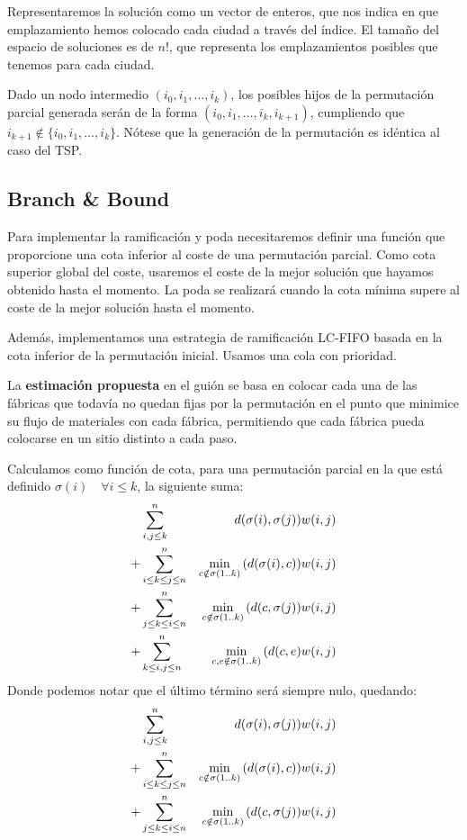 \documentclass[a4paper, 11pt]{article} %
\begin{document}
      Representaremos la solución como un vector de enteros, que nos indica en que emplazamiento hemos colocado cada ciudad a 
      través del índice. El tamaño del espacio de soluciones es de $n!$, que representa los emplazamientos posibles que tenemos 
      para cada ciudad.
      
      Dado un nodo intermedio $(i_0,i_1,\dots,i_k)$, los posibles hijos de la permutación parcial generada serán
      de la forma $(i_0,i_1,\dots,i_k, i_{k+1})$, cumpliendo que $i_{k+1} \notin \{i_0,i_1,\dots,i_k\}$. Nótese
      que la generación de la permutación es idéntica al caso del TSP.
    
    \subsection{Branch \& Bound}
      Para implementar la ramificación y poda necesitaremos definir una función que proporcione una
      cota inferior al coste de una permutación parcial. Como cota superior global del coste, usaremos el
      coste de la mejor solución que hayamos obtenido hasta el momento. La poda se realizará cuando la cota
      mínima supere al coste de la mejor solución hasta el momento.
      
      Además, implementamos una estrategia de ramificación LC-FIFO basada en la cota inferior de la permutación
      inicial. Usamos una cola con prioridad.
      
      La \textbf{estimación propuesta} en el guión se basa en colocar cada una de las fábricas que todavía no
      quedan fijas por la permutación en el punto que minimice su flujo de materiales con cada fábrica,
      permitiendo que cada fábrica pueda colocarse en un sitio distinto a cada paso.
      
      Calculamos como función de cota, para una permutación parcial en la que está definido $\sigma(i) \quad \forall i \leq k$,
      la siguiente suma:
      \begin{eqnarray*}
      \displaystyle
	  & \sum_{i,j \leq k}^n & d(\sigma(i),\sigma(j)) w(i,j) \\
	+ & \sum_{i \leq k \leq j \leq n}^n & \min_{c \notin \sigma(1..k)}{(d(\sigma(i),c))} w(i,j) \\
	+ & \sum_{j \leq k \leq i \leq n}^n & \min_{c \notin \sigma(1..k)}{(d(c,\sigma(j))} w(i,j) \\
	+ & \sum_{k \leq i,j \leq n}^n& \min_{c,e \notin \sigma(1..k)}{(d(c,e)} w(i,j) \\
      \end{eqnarray*}
      Donde podemos notar que el último término será siempre nulo, quedando:
      \begin{eqnarray*}
      \displaystyle
	  & \sum_{i,j \leq k}^n & d(\sigma(i),\sigma(j)) w(i,j) \\
	+ & \sum_{i \leq k \leq j \leq n}^n & \min_{c \notin \sigma(1..k)}{(d(\sigma(i),c))} w(i,j) \\
	+ & \sum_{j \leq k \leq i \leq n}^n & \min_{c \notin \sigma(1..k)}{(d(c,\sigma(j))} w(i,j) \\
      \end{eqnarray*}
      \medskip
      
\end{document}
